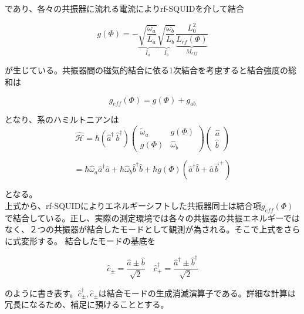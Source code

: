 であり、各々の共振器に流れる電流によりrf-SQUIDを介して結合

\begin{equation}
    g(\Phi)=-\underbrace{\sqrt{\frac{\omega_{a}}{L_{a}}}}_{I_{a}} \underbrace{\sqrt{\frac{\omega_{b}}{L_{b}}}}_{I_{b}} \underbrace{\frac{L_{0}^{2}}{L_{r f}(\Phi)}}_{M_{eff}}
\end{equation}

が生じている。共振器間の磁気的結合に依る1次結合を考慮すると結合強度の総和は

\begin{equation}
    g_{eff}(\Phi)=g(\Phi)+g_{ab}
\end{equation}

となり、系のハミルトニアンは
\begin{equation}
    \hat{\mathcal{H}}=\hbar\left(\hat{a}^{\dagger }\ \hat{b}^{\dagger }\right)\left(\begin{array}{cc}
    \tilde{\omega}_{a} & g(\Phi ) \\
    g(\Phi ) & \hat{\omega}_{b}
    \end{array}\right)\left(\begin{array}{l}
    \hat{a} \\
    \hat{b}
    \end{array}\right)
\end{equation}

\begin{equation}
    = \hbar \hat{\omega}_{a} \hat{a}^{\dagger} \hat{a}+\hbar \hat{\omega}_{b} \hat{b}^{\dagger} \hat{b}+\hbar g(\Phi)\left(\hat{a}^{\dagger}\hat{b}+\hat{a} \vec{b}^{+}\right)
\end{equation}

となる。\\
上式から、rf-SQUIDによりエネルギーシフトした共振器同士は結合項$g_{eff}(\Phi)$で結合している。正し、実際の測定環境では各々の共振器の共振エネルギーではなく、２つの共振器が結合したモードとして観測が為される。そこで上式をさらに式変形する。
結合したモードの基底を

\begin{equation}
    \hat{c}_{\pm}=\frac{\hat{a} \pm \hat{b}}{\sqrt{2}} \quad \hat{c}_{+}^{\dagger}=\frac{\hat{a}^{\dagger} \pm \hat{b}^{\dagger}}{\sqrt{2}}
\end{equation}

のように書き表す。$\hat{c}_{\pm}^{\dagger},\hat{c}_{\pm}$は結合モードの生成消滅演算子である。詳細な計算は冗長になるため、補足に預けることとする。


